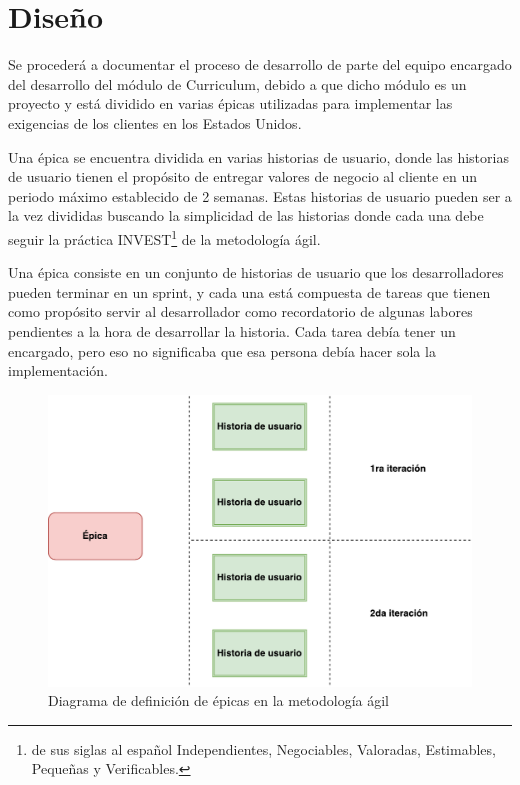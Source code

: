 \section{Diseño}
Se procederá a documentar el proceso de desarrollo de parte del equipo encargado del desarrollo del módulo de Curriculum, debido a que dicho módulo es un proyecto y está dividido en varias épicas utilizadas para implementar las exigencias de los clientes en los Estados Unidos.

Una épica se encuentra dividida en varias historias de usuario, donde las historias de usuario tienen el propósito de entregar valores de negocio al cliente en un periodo máximo establecido de 2 semanas. Estas historias de usuario pueden ser a la vez divididas buscando la simplicidad de las historias donde cada una debe seguir la práctica INVEST\footnote{de sus siglas al español Independientes, Negociables, Valoradas, Estimables, Pequeñas y Verificables.} de la metodología ágil.

Una épica consiste en un conjunto de historias de usuario que los desarrolladores pueden terminar en un sprint, y cada una está compuesta de tareas que tienen como propósito servir al desarrollador como recordatorio de algunas labores pendientes a la hora de desarrollar la historia. Cada tarea debía tener un encargado, pero eso no significaba que esa persona debía hacer sola la implementación.

\begin{figure}[H]
\centering
\includegraphics[width=125mm,scale=1]{Capitulos/PropuestadeSolucion/Imagenes/epic_diagram}
\caption{Diagrama de definición de épicas en la metodología ágil}
  \label{epic}
\end{figure}

